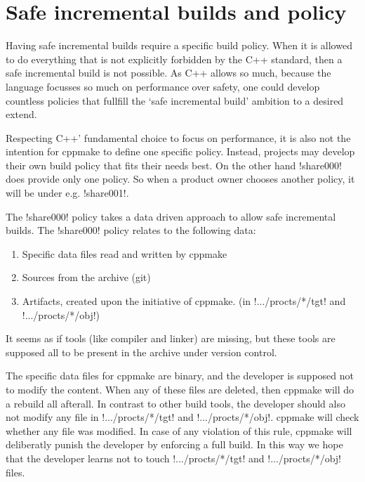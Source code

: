 \section{Safe incremental builds and policy}
\label{sec:share000.cppmake.safe_incremental_builds}

Having safe incremental builds require a specific build policy. When it is allowed
to do everything that is not explicitly forbidden by the C++ standard, then a
safe incremental build is not possible. As C++ allows so much, because the language
focusses so much on performance over safety, one could develop countless policies
that fullfill the `safe incremental build' ambition to a desired extend.

Respecting C++' fundamental choice to focus on performance, it is also not the
intention for cppmake to define one specific policy. Instead, projects may develop
their own build policy that fits their needs best. On the other hand !share000!
does provide only one policy. So when a product owner chooses another policy, it
will be under e.g. !share001!.

The !share000! policy takes a data driven approach to allow safe incremental builds.
The !share000! policy relates to the following data:
\begin{enumerate}
\item Specific data files read and written by cppmake
\item Sources from the archive (git)
\item Artifacts, created upon the initiative of cppmake. (in !.../procts/*/tgt! and 
      !.../procts/*/obj!)
\end{enumerate}

It seems as if tools (like compiler and linker) are missing, but these tools are
supposed all to be present in the archive under version control.

The specific data files for cppmake are binary, and the developer is supposed not
to modify the content. When any of these files are deleted, then cppmake will do
a rebuild all afterall. In contrast to other build tools, the developer should also
not modify any file in !.../procts/*/tgt! and !.../procts/*/obj!. cppmake will check
whether any file was modified. In case of any violation of this rule, cppmake will
deliberatly punish the developer by enforcing a full build. In this way we hope
that the developer learns not to touch !.../procts/*/tgt! and !.../procts/*/obj!
files.


